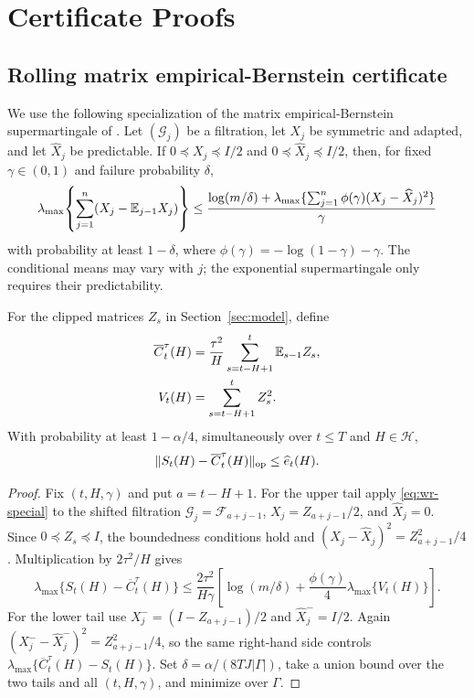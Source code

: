 \section{Certificate Proofs}
\label{app:proofs}

\subsection{Rolling matrix empirical-Bernstein certificate}

We use the following specialization of the matrix empirical-Bernstein supermartingale of \citet{wang2024matrixeb}.  Let $(\mathcal G_j)$ be a filtration, let $X_j$ be symmetric and adapted, and let $\widehat X_j$ be predictable.  If $0\preceq X_j\preceq I/2$ and $0\preceq\widehat X_j\preceq I/2$, then, for fixed $\gamma\in(0,1)$ and failure probability $\delta$,
\begin{equation}
 \lambda_{\max}\!\left\{\sum_{j=1}^n(X_j-\mathbb E_{j-1}X_j)\right\}
 \le \frac{\log(m/\delta)+\lambda_{\max}\{\sum_{j=1}^n\phi(\gamma)(X_j-\widehat X_j)^2\}}{\gamma}
 \label{eq:wr-special}
\end{equation}
with probability at least $1-\delta$, where $\phi(\gamma)=-\log(1-\gamma)-\gamma$.  The conditional means may vary with $j$; the exponential supermartingale only requires their predictability.

\begin{lemma}
\label{lem:eb}
For the clipped matrices $Z_s$ in Section~\ref{sec:model}, define
\begin{align}
 \overline C_t^\tau(H)&=\frac{\tau^2}{H}\sum_{s=t-H+1}^t\mathbb E_{s-1}Z_s,\\
 V_t(H)&=\sum_{s=t-H+1}^t Z_s^2.
\end{align}
With probability at least $1-\alpha/4$, simultaneously over $t\le T$ and $H\in\mathcal H$,
\begin{equation}
 \|S_t(H)-\overline C_t^\tau(H)\|_{\mathrm{op}}\le \widehat e_t(H).
 \label{eq:eb-event}
\end{equation}
\end{lemma}

\begin{proof}
Fix $(t,H,\gamma)$ and put $a=t-H+1$.  For the upper tail apply \eqref{eq:wr-special} to the shifted filtration $\mathcal G_j=\mathcal F_{a+j-1}$, $X_j=Z_{a+j-1}/2$, and $\widehat X_j=0$.  Since $0\preceq Z_s\preceq I$, the boundedness conditions hold and $(X_j-\widehat X_j)^2=Z_{a+j-1}^2/4$.  Multiplication by $2\tau^2/H$ gives
\begin{equation}
 \lambda_{\max}\{S_t(H)-\overline C_t^\tau(H)\}
 \le \frac{2\tau^2}{H\gamma}\left[\log(m/\delta)+\frac{\phi(\gamma)}4\lambda_{\max}\{V_t(H)\}\right].
\end{equation}
For the lower tail use $X_j^-=(I-Z_{a+j-1})/2$ and $\widehat X_j^-=I/2$.  Again $(X_j^--\widehat X_j^-)^2=Z_{a+j-1}^2/4$, so the same right-hand side controls $\lambda_{\max}\{\overline C_t^\tau(H)-S_t(H)\}$.  Set $\delta=\alpha/(8TJ|\Gamma|)$, take a union bound over the two tails and all $(t,H,\gamma)$, and minimize over $\Gamma$.  \end{proof}

